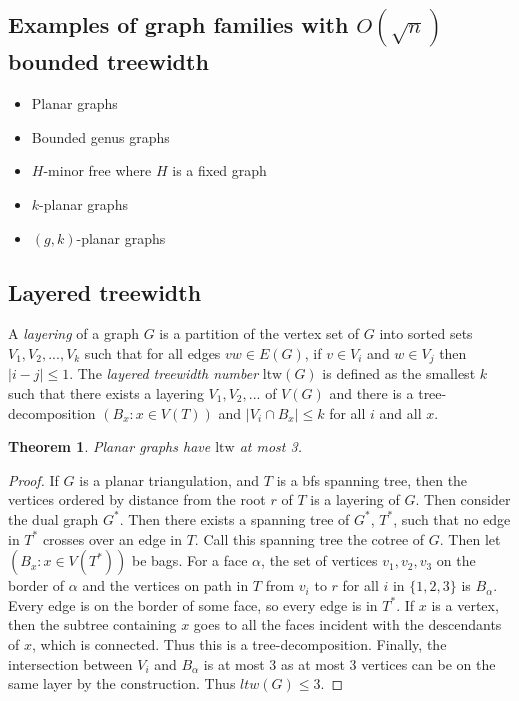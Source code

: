 \documentclass[]{article}
\newcommand{\ltw}{\text{ltw}}
\newtheorem{theorem}{Theorem}
\theoremstyle{definition}
\numberwithin{theorem}{section}
\numberwithin{equation}{section}
\begin{document}
\subsection{Examples of graph families with $O(\sqrt{n})$ bounded treewidth}

\begin{itemize}
	\item Planar graphs
	\item Bounded genus graphs
	\item $H$-minor free where $H$ is a fixed graph
	\item $k$-planar graphs
	\item $(g, k)$-planar graphs
\end{itemize}

\subsection{Layered treewidth}
A \textit{layering} of a graph $G$ is a partition of the vertex set of $G$ into sorted sets $V_1, V_2, ..., V_k$ such that for all edges $vw \in E(G)$, if $v \in V_i$ and $w \in V_j$ then $|i - j| \leq 1$. The \textit{layered treewidth number} $\ltw(G)$ is defined as the smallest $k$ such that there exists a layering $V_1, V_2, ...$ of $V(G)$ and there is a tree-decomposition $(B_x: x \in V(T))$ and $|V_i \cap B_x| \leq k$ for all $i$ and all $x$. 
\begin{theorem}
	Planar graphs have $\ltw$ at most 3. 
\end{theorem}
\begin{proof}
	If $G$ is a planar triangulation, and $T$ is a bfs spanning tree, then the vertices ordered by distance from the root $r$ of $T$ is a layering of $G$. Then consider the dual graph $G^*$. Then there exists a spanning tree of $G^*$, $T^*$, such that no edge in $T^*$ crosses over an edge in $T$. Call this spanning tree the cotree of $G$. Then let $\left( B_x: x \in V(T^*) \right)$ be bags. For a face $\alpha$, the set of vertices $v_1, v_2, v_3$ on the border of $\alpha$ and the vertices on path in $T$ from $v_i$ to $r$ for all $i$ in $\lbrace 1, 2, 3 \rbrace$ is $B_\alpha$. Every edge is on the border of some face, so every edge is in $T^*$. If $x$ is a vertex, then the subtree containing $x$ goes to all the faces incident with the descendants of $x$, which is connected. Thus this is a tree-decomposition. Finally, the intersection between $V_i$ and $B_\alpha$ is at most 3 as at most 3 vertices can be on the same layer by the construction. Thus $ltw(G) \leq 3$. 
\end{proof}
\end{document}
